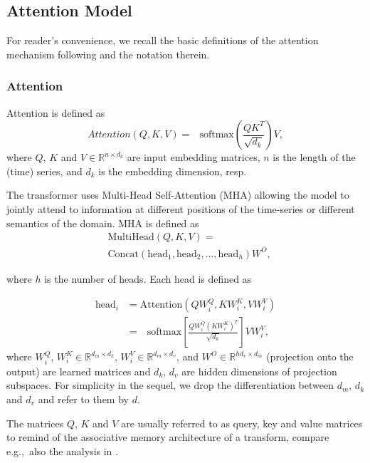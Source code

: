 \documentclass{ieeeaccess}
\begin{document}
\subsection{Attention Model}
For reader's convenience, we recall the basic definitions of the attention mechanism following \cite{VaswaniEtAl} and the notation therein.

\subsubsection{Attention}
\newcommand {\softmax}{\mathop{}\,\mathrm{softmax}}

Attention is defined as
\begin{equation}\label{eq:attention}
Attention(Q, K, V)=\softmax \left(\frac{QK^T}{\sqrt{d_k}} \right) V,
\end{equation}
where $Q$, $K$ and $V\in \mathbb{R}^{n\times d_k}$ are input embedding matrices, $n$ is the length of the (time) series, and $d_k$ is the embedding dimension, resp.

The transformer uses Multi-Head Self-Attention (MHA) allowing the model to jointly attend to information at different positions of the time-series or different semantics of the domain. MHA is defined as 
\begin{align} 
&\text{MultiHead}(Q, K, V) = \\
&\text{Concat}\left(\text{head}_1, \text{head}_2, \ldots, \text{head}_h \right)  W^O, 
\end{align} 


where $h$ is the number of heads. Each head is defined as

\begin{align} 
\text{head}_i 	&= \text{Attention}(QW_i^Q, KW_i^K, VW_i^V) \\
			&= \softmax \left[\frac{QW_i^Q(KW_i^K)^T}{\sqrt{d_k}} \right] VW_i^V,
\end{align} 
where $W_i^Q$, $W_i^K \in \mathbb{R}^{d_m\times d_k}$, $W_i^V \in \mathbb{R}^{d_m\times d_v}$, and $W^O \in \mathbb{R}^{hd_v\times d_m}$ (projection onto the output) are learned matrices and $d_k$, $d_v$ are hidden dimensions of projection subspaces. For simplicity in the sequel, we drop the differentiation between $d_m$, $d_k$ and $d_v$ and refer to them by $d$. 

The matrices $Q$, $K$ and $V$ are usually referred to as query, key and value matrices to remind of the associative memory architecture of a transform, compare e.g.,\ also the analysis in \cite{RamsauerEtAl}.
\end{document}
